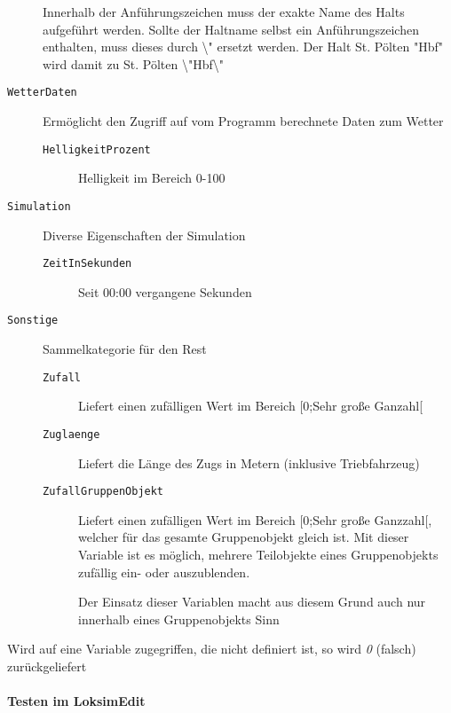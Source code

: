 \begin{description}
\begin{description}
\end{description}

Innerhalb der Anführungszeichen muss der exakte Name des Halts
aufgeführt werden. Sollte der Haltname selbst ein Anführungszeichen
enthalten, muss dieses durch \textbackslash{}" ersetzt werden. Der Halt
St. Pölten "Hbf" wird damit zu St. Pölten
\textbackslash{}"Hbf\textbackslash{}"
\item[\texttt{WetterDaten}]
Ermöglicht den Zugriff auf vom Programm berechnete Daten zum Wetter

\begin{description}
\item[\texttt{HelligkeitProzent}]
Helligkeit im Bereich 0-100
\end{description}

\item[\texttt{Simulation}]
Diverse Eigenschaften der Simulation
\begin{description}
\item[\texttt{ZeitInSekunden}]
Seit 00:00 vergangene Sekunden
\end{description}

\item[\texttt{Sonstige}]
Sammelkategorie für den Rest

\begin{description}
\item[\texttt{Zufall}]
Liefert einen zufälligen Wert im Bereich {[}0;Sehr große Ganzahl{[}
\item[\texttt{Zuglaenge}]
Liefert die Länge des Zugs in Metern (inklusive Triebfahrzeug)
\item[\texttt{ZufallGruppenObjekt}]
Liefert einen zufälligen Wert im Bereich {[}0;Sehr große Ganzzahl{[},
welcher für das gesamte Gruppenobjekt gleich ist. Mit dieser Variable
ist es möglich, mehrere Teilobjekte eines Gruppenobjekts zufällig ein-
oder auszublenden.

Der Einsatz dieser Variablen macht aus diesem Grund auch nur innerhalb
eines Gruppenobjekts Sinn
\end{description}
\end{description}

Wird auf eine Variable zugegriffen, die nicht definiert ist, so wird
\emph{0} (falsch) zurückgeliefert

\paragraph{Testen im LoksimEdit}

